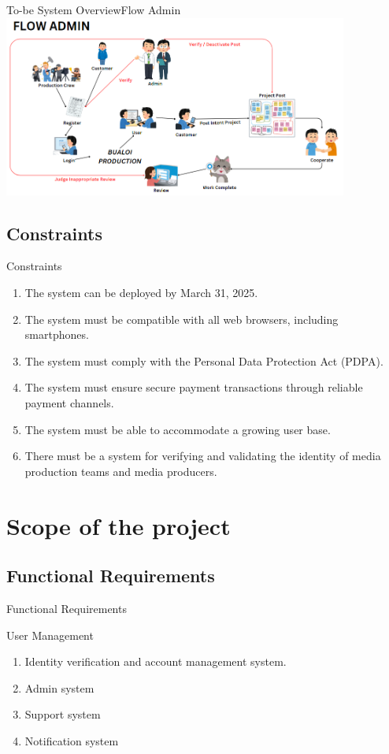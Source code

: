 \documentclass[aspectratio=169]{beamer}
\begin{document}
\begin{frame}{To-be System Overview}{Flow Admin}
    \centering
    \includegraphics[width=0.85\textwidth]{flowadmin.png}
\end{frame}



\subsection{Constraints}
\begin{frame}{Constraints}
    \begin{enumerate}
        \item The system can be deployed by March 31, 2025.
        \item The system must be compatible with all web browsers, including smartphones.
        \item The system must comply with the Personal Data Protection Act (PDPA).
        \item The system must ensure secure payment transactions through reliable payment channels.
        \item The system must be able to accommodate a growing user base.
        \item There must be a system for verifying and validating the identity of media production teams and media producers.
    \end{enumerate}
\end{frame}

\section{Scope of the project}
\subsection{Functional Requirements}

\begin{frame}{Functional Requirements}
    \begin{alertblock}{User Management}
        \begin{enumerate}
            \item Identity verification and account management system.
            \item Admin system
            \item Support system
            \item Notification system
        \end{enumerate}
    \end{alertblock}

\end{frame}
\end{document}
